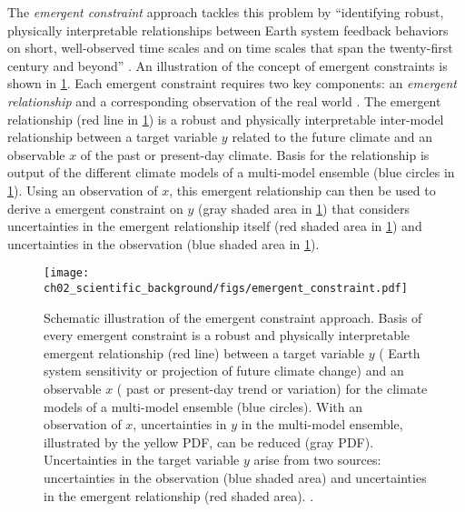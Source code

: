 The \emph{emergent constraint} approach tackles this problem by
\enquote{identifying robust, physically interpretable relationships between
  Earth system feedback behaviors on short, well-observed time scales and on
  time scales that span the twenty-first century and beyond}
\autocite{Eyring2019}. An illustration of the concept of emergent constraints
is shown in \cref{fig:02:emergent_constraint}. Each emergent constraint
requires two key components: an \emph{emergent relationship} and a
corresponding observation of the real world \autocite{Eyring2019}. The emergent
relationship (red line in \cref{fig:02:emergent_constraint}) is a robust and
physically interpretable inter-model relationship between a target variable $y$
related to the future climate and an observable $x$ of the past or present-day
climate. Basis for the relationship is output of the different climate models
of a multi-model ensemble (blue circles in \cref{fig:02:emergent_constraint}).
Using an observation of $x$, this emergent relationship can then be used to
derive a emergent constraint on $y$ (gray shaded area in
\cref{fig:02:emergent_constraint}) that considers uncertainties in the emergent
relationship itself (red shaded area in \cref{fig:02:emergent_constraint}) and
uncertainties in the observation (blue shaded area in
\cref{fig:02:emergent_constraint}).

\begin{figure}[t]
  \centering
  \texttt{[image: 
    ch02\_scientific\_background/figs/emergent\_constraint.pdf]}
  \caption{Schematic illustration of the emergent constraint approach. Basis of
    every emergent constraint is a robust and physically interpretable emergent
    relationship (red line) between a target variable $y$ (\eg{} Earth system
    sensitivity or projection of future climate change) and an observable $x$
    (\eg{} past or present-day trend or variation) for the climate models of a
    multi-model ensemble (blue circles). With an observation of $x$,
    uncertainties in $y$ in the multi-model ensemble, illustrated by the yellow
    \acf{PDF}, can be reduced (gray \acs{PDF}). Uncertainties in the target
    variable $y$ arise from two sources: uncertainties in the observation (blue
    shaded area) and uncertainties in the emergent relationship (red shaded
    area). .}
  \label{fig:02:emergent_constraint}
\end{figure}

